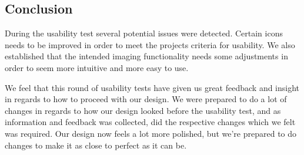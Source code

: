 \subsection{Conclusion}
During the usability test several potential issues were detected. Certain icons needs to be improved in order to meet the projects criteria for usability. We also established that the intended imaging functionality needs some adjustments in order to seem more intuitive and more easy to use. 

We feel that this round of usability tests have given us great feedback and insight in regards to how to proceed with our design. We were prepared to do a lot of changes in regards to how our design looked before the usability test, and as information and feedback was collected, did the respective changes which we felt was required. Our design now feels a lot more polished, but we’re prepared to do changes to make it as close to perfect as it can be.
